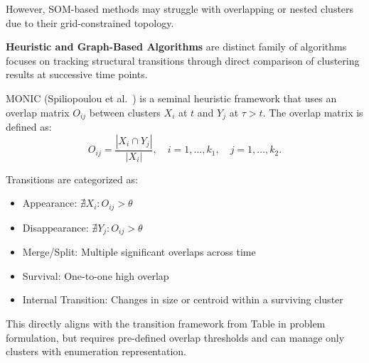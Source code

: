 However, SOM-based methods may struggle with overlapping or nested clusters due
to their grid-constrained topology.

\textbf{Heuristic and Graph-Based Algorithms} are distinct family of algorithms focuses
on tracking structural transitions through direct comparison of clustering results at
successive time points.

\textsc{MONIC} (Spiliopoulou et al.~\cite{monic}) is a seminal heuristic framework that uses an overlap
matrix $O_{ij}$ between clusters $X_i$ at $t$ and $Y_j$ at $\tau > t$.
The overlap matrix is defined as:
\begin{equation}
    O_{ij} = \frac{|X_i \cap Y_j|}{|X_i|}, \quad i = 1, \ldots, k_1, \quad j = 1, \ldots, k_2.
\end{equation}

Transitions are categorized as:
\begin{itemize}
    \item Appearance: $\nexists X_i: O_{ij} > \theta$

    \item Disappearance: $\nexists Y_j: O_{ij} > \theta$

    \item Merge/Split: Multiple significant overlaps across time

    \item Survival: One-to-one high overlap

    \item Internal Transition: Changes in size or centroid within a surviving cluster
\end{itemize}

This directly aligns with the transition framework from Table in problem
formulation, but requires pre-defined overlap thresholds and can manage only
clusters with enumeration representation.

